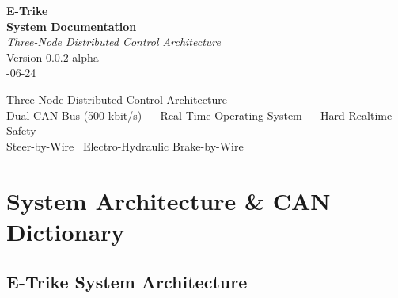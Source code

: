 \documentclass[12pt,a4paper,oneside]{report}
\begin{document}

\thispagestyle{empty}

\vspace*{60mm}

\begin{center}
  {\fontsize{28}{34}\selectfont\textbf{E-Trike}}\\[8mm]
  {\fontsize{22}{28}\selectfont\textbf{System Documentation}}\\[20mm]
  {\fontsize{14}{18}\selectfont\textit{Three-Node Distributed Control Architecture}}\\[30mm]
  {\fontsize{12}{15}\selectfont Version 0.0.2-alpha}\\[4mm]
  {\fontsize{11}{14}-06-24}
\end{center}

\vfill

\begin{center}
  {\footnotesize
  Three-Node Distributed Control Architecture\\[2mm]
  Dual CAN Bus (500 kbit/s) --- Real-Time Operating System --- Hard Realtime Safety\\[2mm]
  Steer-by-Wire \textbullet\ Electro-Hydraulic Brake-by-Wire
  }
\end{center}

\newpage


\setcounter{tocdepth}{1}
\tableofcontents
\newpage


\part{System Architecture \& CAN Dictionary}
\label{part:architecture}

\chapter{E-Trike System Architecture}\label{e-trike-system-architecture}
\end{document}
